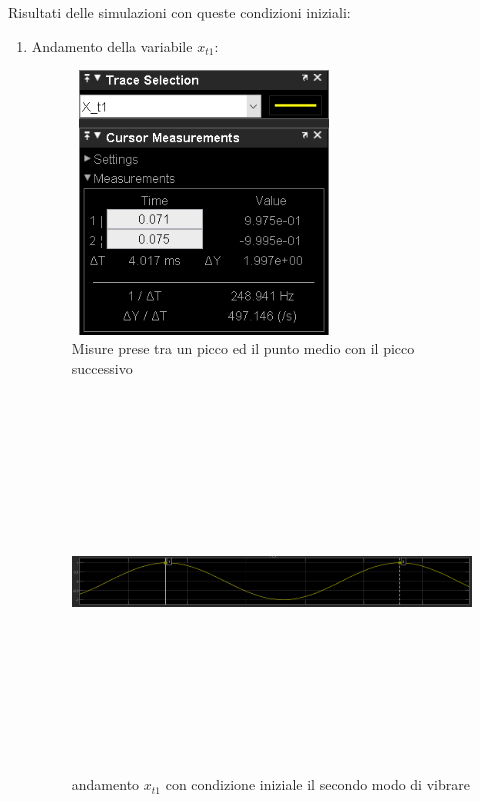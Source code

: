 \documentclass{article}
\begin{document}
Risultati delle simulazioni con queste condizioni iniziali: 
\begin{enumerate}

    \item 
     Andamento della variabile $x_{t1}$:
     
        \begin{figure}[H]
        \centering
        \includegraphics[width=7cm,height=7cm,keepaspectratio]{./simulink/assex/modo2_t1tab.png}
        \caption{Misure prese tra un picco ed il punto medio con il picco successivo}
        \end{figure}
        
        \begin{figure}[H]
        \centering
        \includegraphics[width=12cm,height=10cm,keepaspectratio]{./simulink/assex/modo2_t1.png}
        \caption{andamento $x_{t1}$ con condizione iniziale il secondo modo di vibrare}
        \end{figure}


\end{enumerate}
\end{document}
